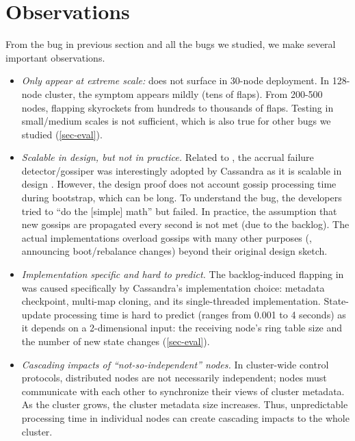 
\section{Observations}
\label{mot-observe}

From the bug in previous section and all the bugs we studied, we make several
important observations.

\begin{itemize}
\item {\em Only appear at extreme scale:} \caone does not surface in 30-node
deployment.  In 128-node cluster, the symptom appears mildly (tens of
flaps).  From 200-500 nodes, flapping skyrockets from hundreds to 
thousands of flaps.  Testing in small/medium scales is not sufficient,
which is also true for other bugs we studied (\sec\ref{sec-eval}).





\item {\em Scalable in design, but not in practice.}  Related to \caone,
the accrual failure detector/gossiper
\cite{Hayashibara+04-PhiFailureDetector} was interestingly adopted by
Cassandra as it is scalable in design \cite{Lakshman+09-Cassandra}.
However, the design proof does not account gossip processing time during
bootstrap, which can be long.  To understand the bug, the developers tried
to ``do the [simple] math'' \cite{CA-One} but failed.  In practice, the
assumption that new gossips are propagated every second is not met (due to
the backlog).  The actual implementations overload gossips with many other
purposes (\eg, announcing boot/rebalance changes) beyond their original
design sketch.



\item {\em Implementation specific and hard to predict.}  The
backlog-induced flapping in \caone was caused specifically by Cassandra's
implementation choice: metadata checkpoint, multi-map cloning, and its
single-threaded implementation.  State-update processing time is hard to
predict (ranges from 0.001 to 4 seconds) as it depends on a 2-dimensional
input: the receiving node's ring table size and the number of new
state changes (\sec\ref{sec-eval}).


\item {\em Cascading impacts of ``not-so-independent'' nodes.}  In 
cluster-wide control protocols, distributed nodes are  not
necessarily independent; nodes must communicate with each other
to synchronize their views of cluster metadata.  As the cluster grows, the
cluster metadata size increases.  Thus, unpredictable processing time in
individual nodes can create cascading impacts to the whole cluster.



\end{itemize}
